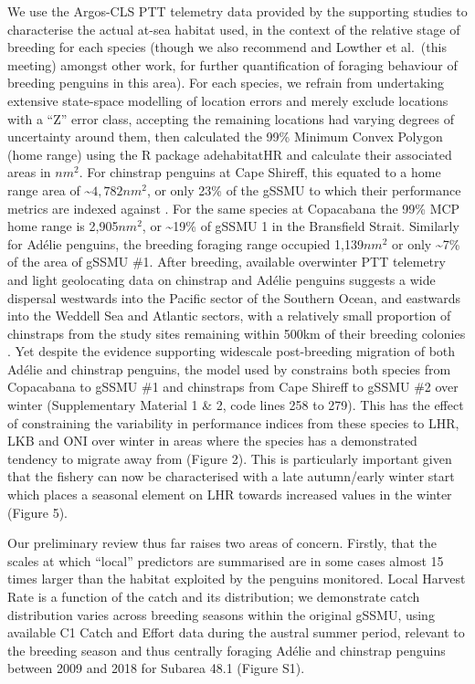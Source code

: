 \documentclass[]{elsarticle} %
\begin{document}
We use the Argos-CLS PTT telemetry data provided by the supporting
studies to characterise the actual at-sea habitat used, in the context
of the relative stage of breeding for each species (though we also
recommend \citet{Warwick-Evans2018} and Lowther et al.~(this meeting)
amongst other work, for further quantification of foraging behaviour of
breeding penguins in this area). For each species, we refrain from
undertaking extensive state-space modelling of location errors and
merely exclude locations with a ``Z'' error class, accepting the
remaining locations had varying degrees of uncertainty around them, then
calculated the 99\% Minimum Convex Polygon (home range) using the R
package adehabitatHR and calculate their associated areas in \(nm^2\).
For chinstrap penguins at Cape Shireff, this equated to a home range
area of \textasciitilde{}\(4,782nm^2\), or only 23\% of the gSSMU to
which their performance metrics are indexed against \citep{Watters2020}.
For the same species at Copacabana the 99\% MCP home range is
2,905\(nm^2\), or \textasciitilde19\% of gSSMU 1 in the Bransfield
Strait. Similarly for Adélie penguins, the breeding foraging range
occupied 1,139\(nm^2\) or only \textasciitilde7\% of the area of gSSMU
\#1. After breeding, available overwinter PTT telemetry and light
geolocating data on chinstrap and Adélie penguins suggests a wide
dispersal westwards into the Pacific sector of the Southern Ocean, and
eastwards into the Weddell Sea and Atlantic sectors, with a relatively
small proportion of chinstraps from the study sites remaining within
500km of their breeding colonies \citep{Hinke2019}. Yet despite the
evidence supporting widescale post-breeding migration of both Adélie and
chinstrap penguins, the model used by \citet{Watters2020} constrains
both species from Copacabana to gSSMU \#1 and chinstraps from Cape
Shireff to gSSMU \#2 over winter (Supplementary Material 1 \& 2, code
lines 258 to 279). This has the effect of constraining the variability
in performance indices from these species to LHR, LKB and ONI over
winter in areas where the species has a demonstrated tendency to migrate
away from (Figure 2). This is particularly important given that the
fishery can now be characterised with a late autumn/early winter start
which places a seasonal element on LHR towards increased values in the
winter (Figure 5).

Our preliminary review thus far raises two areas of concern. Firstly,
that the scales at which ``local'' predictors are summarised are in some
cases almost 15 times larger than the habitat exploited by the penguins
monitored. Local Harvest Rate is a function of the catch and its
distribution; we demonstrate catch distribution varies across breeding
seasons within the original gSSMU, using available C1 Catch and Effort
data during the austral summer period, relevant to the breeding season
and thus centrally foraging Adélie and chinstrap penguins between 2009
and 2018 for Subarea 48.1 (Figure S1).
\end{document}
